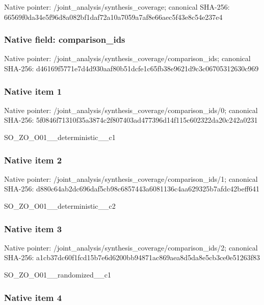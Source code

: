 \documentclass[10pt,a4paper]{article}
\begin{document}
Native pointer: /joint\_analysis/synthesis\_coverage; canonical SHA-256: 66569f0da34e5f96d8a082bf\allowbreak{}1daf72a10a7059a7af8e66ae\allowbreak{}c5f43e8c54e237e4



\subsubsection{Native field: comparison\_ids}


Native pointer: /joint\_analysis/synthesi\allowbreak{}s\_coverage/comparison\_id\allowbreak{}s; canonical SHA-256: d46169f5771e7d4d930aaf80\allowbreak{}b51dcfe1c65fb38e9621d9c3\allowbreak{}c06705312630c969



\subsubsection{Native item 1}


Native pointer: /joint\_analysis/synthesi\allowbreak{}s\_coverage/comparison\_id\allowbreak{}s/0; canonical SHA-256: 5f0846f71310f35a3874c2f8\allowbreak{}07403ad477396d14f115c602\allowbreak{}322da20c242a0231


SO\_ZO\_O01\_\_deterministic\_\_c1


\subsubsection{Native item 2}


Native pointer: /joint\_analysis/synthesi\allowbreak{}s\_coverage/comparison\_id\allowbreak{}s/1; canonical SHA-256: d880c64ab2dc696daf5cb98c\allowbreak{}6857443a6081136c4aa62932\allowbreak{}5b7afdc42beff641


SO\_ZO\_O01\_\_deterministic\_\_c2


\subsubsection{Native item 3}


Native pointer: /joint\_analysis/synthesi\allowbreak{}s\_coverage/comparison\_id\allowbreak{}s/2; canonical SHA-256: a1cb37dc60f1fcd15b7e6d62\allowbreak{}00bb94871ac869aea8d5da8e\allowbreak{}5cb3ce0e51263f83


SO\_ZO\_O01\_\_randomized\_\_c1


\subsubsection{Native item 4}
\end{document}
